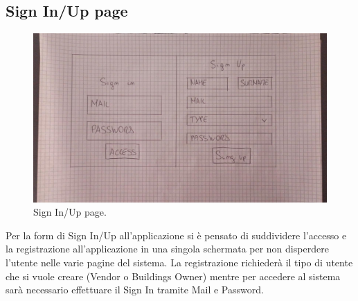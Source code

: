 \documentclass{report}
\begin{document}
\subsection{Sign In/Up page}
\begin{figure}[H]
  \includegraphics[width=\linewidth]{Sign.jpeg}
  \caption{Sign In/Up page.}
  \label{fig:Sign In/Up page}
\end{figure}
\par Per la form di Sign In/Up all'applicazione si è pensato di suddividere l'accesso e la registrazione all'applicazione in una singola schermata per non disperdere l'utente nelle varie pagine del sistema. La registrazione richiederà il tipo di utente che si vuole creare (Vendor o Buildings Owner) mentre per accedere al sistema sarà necessario effettuare il Sign In  tramite Mail e Password.
\end{document}
